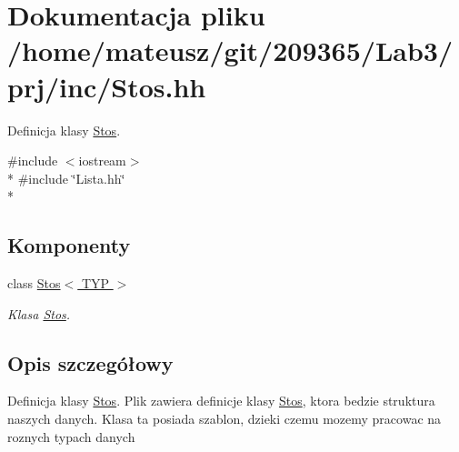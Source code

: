 \hypertarget{_stos_8hh}{\section{Dokumentacja pliku /home/mateusz/git/209365/\-Lab3/prj/inc/\-Stos.hh}
\label{_stos_8hh}
}


Definicja klasy \hyperlink{class_stos}{Stos}.  


{\ttfamily \#include $<$iostream$>$}\\*
{\ttfamily \#include \char`\"{}Lista.\-hh\char`\"{}}\\*
\subsection*{Komponenty}
\begin{DoxyCompactItemize}
\item 
class \hyperlink{class_stos}{Stos$<$ T\-Y\-P $>$}
\begin{DoxyCompactList}\small\item\em Klasa \hyperlink{class_stos}{Stos}. \end{DoxyCompactList}\end{DoxyCompactItemize}


\subsection{Opis szczegółowy}
Definicja klasy \hyperlink{class_stos}{Stos}. Plik zawiera definicje klasy \hyperlink{class_stos}{Stos}, ktora bedzie struktura naszych danych. Klasa ta posiada szablon, dzieki czemu mozemy pracowac na roznych typach danych 
